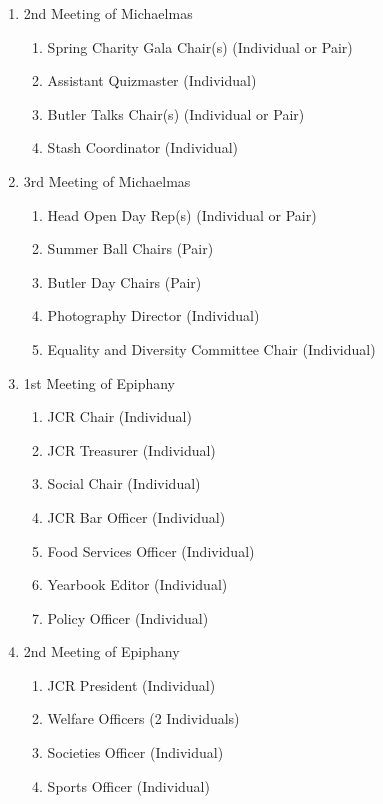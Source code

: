 \begin{enumerate}
\begin{enumerate}
\begin{enumerate}
        \end{enumerate}
        \item 2nd Meeting of Michaelmas
        \begin{enumerate}
            \item Spring Charity Gala Chair(s) (Individual or Pair) 
            \item Assistant Quizmaster (Individual)
            \item Butler Talks Chair(s) (Individual or Pair)
            \item Stash Coordinator (Individual)
        \end{enumerate}
        \item 3rd Meeting of Michaelmas
        \begin{enumerate}
            \item Head Open Day Rep(s) (Individual or Pair) 
            \item Summer Ball Chairs (Pair)
            \item Butler Day Chairs (Pair)
            \item Photography Director (Individual) 
            \item Equality and Diversity Committee Chair (Individual)
        \end{enumerate}
        \item 1st Meeting of Epiphany
        \begin{enumerate}
            \item JCR Chair (Individual)
            \item JCR Treasurer (Individual)
            \item Social Chair (Individual)
            \item JCR Bar Officer (Individual)
            \item Food Services Officer (Individual) 
            \item Yearbook Editor (Individual)
            \item Policy Officer (Individual)
        \end{enumerate}
        \item 2nd Meeting of Epiphany
        \begin{enumerate}
            \item JCR President (Individual) 
            \item Welfare Officers (2 Individuals) 
            \item Societies Officer (Individual) 
            \item Sports Officer (Individual) 

\end{enumerate}
\end{enumerate}
\end{enumerate}
